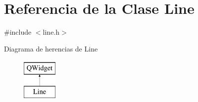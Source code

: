 \hypertarget{class_line}{}\section{Referencia de la Clase Line}
\label{class_line}


{\ttfamily \#include $<$line.\+h$>$}

Diagrama de herencias de Line\begin{figure}[H]
\begin{center}
\leavevmode
\includegraphics[height=2.000000cm]{class_line}
\end{center}
\end{figure}
